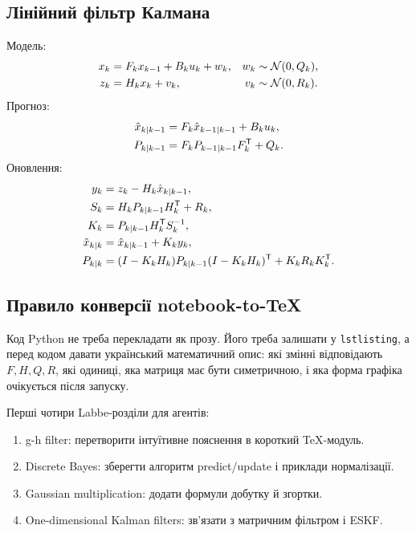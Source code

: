 \subsection{Лінійний фільтр Калмана}

Модель:
\begin{align}
 x_k &= F_kx_{k-1}+B_ku_k+w_k, & w_k&\sim\mathcal{N}(0,Q_k),\\
 z_k &= H_kx_k+v_k, & v_k&\sim\mathcal{N}(0,R_k).
\end{align}
Прогноз:
\begin{align}
 \hat x_{k|k-1}&=F_k\hat x_{k-1|k-1}+B_ku_k,\\
 P_{k|k-1}&=F_kP_{k-1|k-1}F_k^{\mathsf T}+Q_k.
\end{align}
Оновлення:
\begin{align}
 y_k&=z_k-H_k\hat x_{k|k-1},\\
 S_k&=H_kP_{k|k-1}H_k^{\mathsf T}+R_k,\\
 K_k&=P_{k|k-1}H_k^{\mathsf T} S_k^{-1},\\
 \hat x_{k|k}&=\hat x_{k|k-1}+K_ky_k,\\
 P_{k|k}&=(I-K_kH_k)P_{k|k-1}(I-K_kH_k)^{\mathsf T}+K_kR_kK_k^{\mathsf T}.
\end{align}

\subsection{Правило конверсії notebook-to-TeX}

Код Python не треба перекладати як прозу. Його треба залишати у \texttt{lstlisting}, а перед кодом давати український математичний опис: які змінні відповідають $F,H,Q,R$, які одиниці, яка матриця має бути симетричною, і яка форма графіка очікується після запуску.

Перші чотири Labbe-розділи для агентів:
\begin{enumerate}
\item g-h filter: перетворити інтуїтивне пояснення в короткий TeX-модуль.
\item Discrete Bayes: зберегти алгоритм predict/update і приклади нормалізації.
\item Gaussian multiplication: додати формули добутку й згортки.
\item One-dimensional Kalman filters: зв'язати з матричним фільтром і ESKF.
\end{enumerate}
